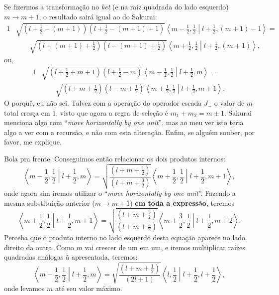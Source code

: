 \documentclass{article}
\newcommand{\abraket}[2]{\left\langle #1 \middle| #2 \right\rangle}
\begin{document}
Se fizermos a transformação no \textit{ket} (e na raiz quadrada do lado esquerdo) $m \to m + 1$, o resultado sairá igual ao do Sakurai:
\begin{alignat}{1}
\nonumber
 &\sqrt{\left(l + \frac{1}{2} + (m+1)\right)\left(l + \frac{1}{2} - (m+1) + 1\right)} \abraket{m -
 \frac{1}{2},\frac{1}{2}}{l + \frac{1}{2},(m+1) - 1} = \\
 &\qquad \sqrt{\left(l + (m+1) + \frac{1}{2}\right)\left(l - (m+1) + \frac{1}{2}\right)}
 \abraket{m + \frac{1}{2},\frac{1}{2}}{l + \frac{1}{2},(m+1)}\mathrm{,}
\end{alignat}
ou,
\begin{alignat}{1}
\nonumber
 &\sqrt{\left(l + \frac{1}{2} + m + 1\right)\left(l + \frac{1}{2} - m\right)} \abraket{m -
 \frac{1}{2},\frac{1}{2}}{l + \frac{1}{2},m} = \\
 &\qquad \sqrt{\left(l + m + \frac{1}{2}\right)\left(l - m + \frac{1}{2}\right)}
 \abraket{m + \frac{1}{2},\frac{1}{2}}{l + \frac{1}{2},m + 1}\mathrm{,}
\end{alignat}
O porquê, eu não sei. Talvez com a operação do operador escada $J_-$ o valor de $m$ total cresça em 1, visto que agora a regra de seleção é $m_1 + m_2 = m \pm 1$.
Sakurai menciona algo com ``\textit{move horizontally by one unit}'', mas ao meu ver isto teria algo a ver com a recursão, e não com esta alteração.
Enfim, se alguém souber, por favor, me explique.

Bola pra frente. Conseguimos então relacionar os dois produtos internos:
\begin{equation}
 \abraket{m - \frac{1}{2},\frac{1}{2}}{l + \frac{1}{2},m} =
 \sqrt{\frac{\left(l + m + \frac{1}{2}\right)}{\left(l + m + \frac{3}{2}\right)}}
 \abraket{m + \frac{1}{2},\frac{1}{2}}{l + \frac{1}{2},m + 1}\mathrm{,}
\end{equation}
onde agora sim iremos utilizar o ``\textit{move horizontally by one unit}''.
Fazendo a mesma substituição anterior ($m \to m + 1$) \textbf{em toda a expressão}, teremos
\begin{equation}
 \abraket{m + \frac{1}{2},\frac{1}{2}}{l + \frac{1}{2},m + 1} =
 \sqrt{\frac{\left(l + m + \frac{3}{2}\right)}{\left(l + m + \frac{5}{2}\right)}}
 \abraket{m + \frac{3}{2},\frac{1}{2}}{l + \frac{1}{2},m + 2}\mathrm{.}
\end{equation}
Perceba que o produto interno no lado esquerdo desta equação aparece no lado direito da outra. Como $m$ vai crescer de um em um, e iremos multiplicar raízes quadradas
análogas à apresentada, teremos:
\begin{equation}
 \abraket{m - \frac{1}{2},\frac{1}{2}}{l + \frac{1}{2},m} =
 \sqrt{\frac{\left(l + m + \frac{1}{2}\right)}{\left(2l + 1\right)}}
 \abraket{l,\frac{1}{2}}{l + \frac{1}{2},l + \frac{1}{2}}\mathrm{,}
\end{equation}
onde levamos $m$ até seu valor máximo.
\end{document}
